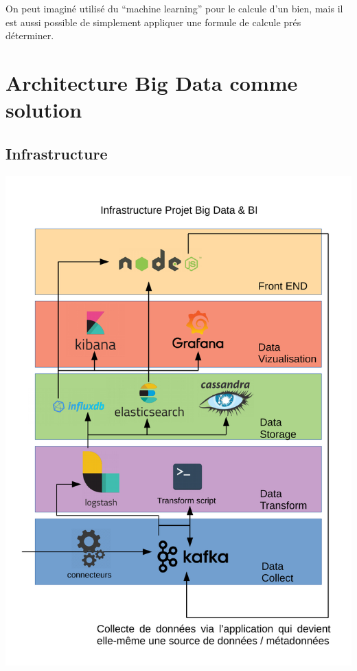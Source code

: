 \documentclass[12pt]{report}
\begin{document}
On peut imaginé utilisé du ``machine learning'' pour le calcule d'un bien, mais
il est aussi possible de simplement appliquer une formule de calcule prés
déterminer.

\chapter{Architecture Big Data comme solution}
\goodbreak

\section{Infrastructure}
\includegraphics[width=16cm]{pdfinc/SchemaInfra.pdf}

\goodbreak
\end{document}
